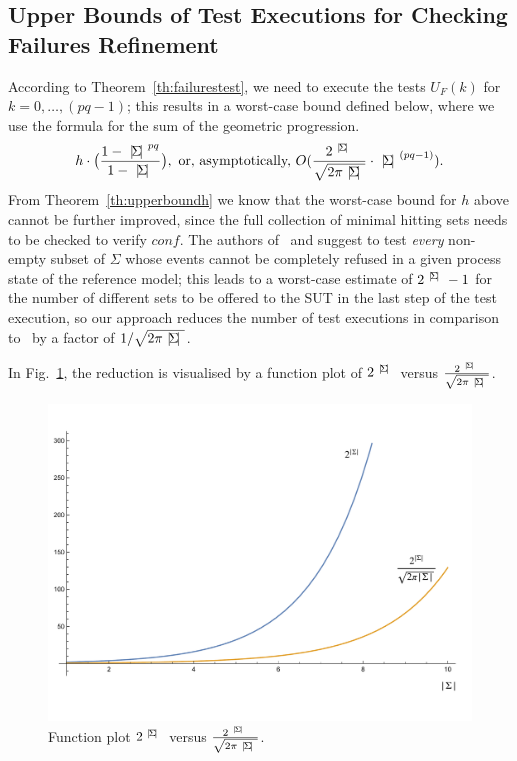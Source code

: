 \subsection{Upper Bounds of Test Executions for Checking Failures Refinement}
According to  Theorem~\ref{th:failurestest}, we need to execute the tests $U_F(k)$ for
$k = 0,\dots,(pq-1)$; this results in a worst-case bound defined below, where
we use the formula for the sum of the geometric progression.
%
\[
h\cdot \big( \frac{1-\card{\Sigma}^{pq}}{1-\card{\Sigma}} \big),\
 \text{or, asymptotically,}\  O(\frac{2^\card{\Sigma}}{\sqrt{2\pi \card{\Sigma}}}\cdot\card{\Sigma}^{(pq-1)}).
 \]
%
From Theorem~\ref{th:upperboundh} we know that the worst-case bound for $h$
above cannot be further improved, since the full collection of minimal
hitting sets needs to be checked to verify $conf$. The
authors of~\cite{Hennessy:1988:ATP:50497} and
\cite{DBLP:conf/icfem/CavalcantiG07} suggest to test {\it every} non-empty
subset of $\Sigma$ whose events cannot be completely refused in a given
process state of the reference model; this leads to a worst-case estimate of
$2^{{~|\! \Sigma\!|~}}-1$ for the number of different sets to be offered to the SUT in
the last step of the test execution, so our approach reduces the number of
test executions in comparison
to~\cite{Hennessy:1988:ATP:50497,DBLP:conf/icfem/CavalcantiG07} by a factor of
$1/{\sqrt{2\pi {~|\! \Sigma\!|~}}}$.

In Fig.~\ref{fig:minhita}, the reduction is visualised by a function plot of
$2^{{~|\! \Sigma\!|~}}$ versus $\frac{2^{~|\! \Sigma\!|~}}{\sqrt{2\pi {~|\! \Sigma\!|~}}}$.



 \begin{figure}
 \begin{center}
\includegraphics[width=.8\textwidth]{minhit-fig.pdf}
\end{center}
\vspace*{-10mm}
\caption{Function plot $2^{{~|\! \Sigma\!|~}}$ versus $\frac{2^{~|\! \Sigma\!|~}}{\sqrt{2\pi {~|\! \Sigma\!|~}}}$.}
 \label{fig:minhita}
 \end{figure}

